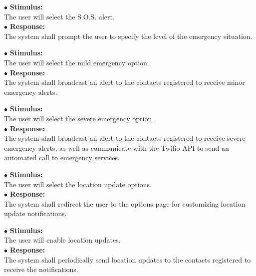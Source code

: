 \documentclass{scrreprt}
\begin{document}
\vspace{5mm}
	\hspace{-4.75mm} $\bullet$ \textbf{Stimulus:} \\ \hspace{5mm} The user will select the S.O.S. alert.\\
	$\bullet$ \textbf{Response:} \\ \hspace{5mm} The system shall prompt the user to specify the level of the emergency situation.

\vspace{5mm}
	\hspace{-4.75mm} $\bullet$ \textbf{Stimulus:} \\ \hspace{5mm} The user will select the mild emergency option.\\
	$\bullet$ \textbf{Response:} \\ \hspace{5mm} The system shall broadcast an alert to the contacts registered to receive minor emergency alerts.

\vspace{5mm}
	\hspace{-4.75mm} $\bullet$ \textbf{Stimulus:} \\ \hspace{5mm} The user will select the severe emergency option.\\
	$\bullet$ \textbf{Response:} \\ \hspace{5mm} The system shall broadcast an alert to the contacts registered to receive severe emergency alerts, as well as communicate with the Twilio API to send an automated call to emergency services.

\vspace{5mm}
	\hspace{-4.75mm} $\bullet$ \textbf{Stimulus:} \\ \hspace{5mm} The user will select the location update options.\\
	$\bullet$ \textbf{Response:} \\ \hspace{5mm} The system shall redirect the user to the options page for customizing location update notifications.

\vspace{5mm}
	\hspace{-4.75mm} $\bullet$ \textbf{Stimulus:} \\ \hspace{5mm} The user will enable location updates.\\
	$\bullet$ \textbf{Response:} \\ \hspace{5mm} The system shall periodically send location updates to the contacts registered to receive the notifications.
\newpage
\end{document}
